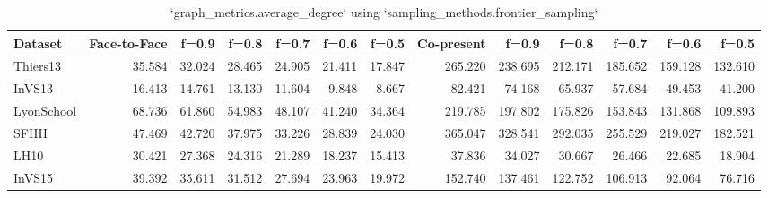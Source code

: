 \begin{table}[ht]
\begin{tabular}{lrrrrrrrrrrrr}
\hline
 Dataset    &   Face-to-Face &   f=0.9 &   f=0.8 &   f=0.7 &   f=0.6 &   f=0.5 &   Co-present &   f=0.9 &   f=0.8 &   f=0.7 &   f=0.6 &   f=0.5 \\
\hline
 Thiers13   &         35.584 &  32.024 &  28.465 &  24.905 &  21.411 &  17.847 &      265.220 & 238.695 & 212.171 & 185.652 & 159.128 & 132.610 \\
 InVS13     &         16.413 &  14.761 &  13.130 &  11.604 &   9.848 &   8.667 &       82.421 &  74.168 &  65.937 &  57.684 &  49.453 &  41.200 \\
 LyonSchool &         68.736 &  61.860 &  54.983 &  48.107 &  41.240 &  34.364 &      219.785 & 197.802 & 175.826 & 153.843 & 131.868 & 109.893 \\
 SFHH       &         47.469 &  42.720 &  37.975 &  33.226 &  28.839 &  24.030 &      365.047 & 328.541 & 292.035 & 255.529 & 219.027 & 182.521 \\
 LH10       &         30.421 &  27.368 &  24.316 &  21.289 &  18.237 &  15.413 &       37.836 &  34.027 &  30.667 &  26.466 &  22.685 &  18.904 \\
 InVS15     &         39.392 &  35.611 &  31.512 &  27.694 &  23.963 &  19.972 &      152.740 & 137.461 & 122.752 & 106.913 &  92.064 &  76.716 \\
\hline
\end{tabular}
\caption{`graph_metrics.average_degree` using `sampling_methods.frontier_sampling`}
\end{table}